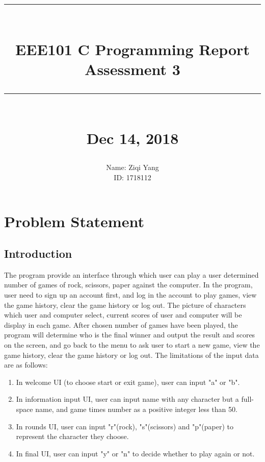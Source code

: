 \documentclass[12pt]{article}
\newcommand{\HRule}[1]{\rule{\linewidth}{#1}}
\begin{document}
	
	\title{ \normalsize \textsc{}
		\\ [2.0cm]
		\HRule{0.5pt} \\
		\LARGE \textbf{EEE101 C Programming Report\\Assessment 3}
		\HRule{2pt} \\ [0.5cm]
		\normalsize Dec 14, 2018 \vspace*{5\baselineskip}}
	
	\date{}
	
	\author{
		Name: Ziqi Yang\\
		ID: 1718112\\
	}
	
	\maketitle
	\newpage
	\tableofcontents
	\newpage
	
	
	\section{Problem Statement}
	
	\subsection{Introduction}
	The program provide an interface through which user can play a user determined number of games of rock, scissors, paper against the computer. In the program, user need to sign up an account first, and log in the account to play games, view the game history, clear the game history or log out. The picture of characters which user and computer select, current scores of user and computer will be display in each game. After chosen number of games have been played, the program will determine who is the final winner and output the result and scores on the screen, and go back to the menu to ask user to start a new game, view the game history, clear the game history or log out. The limitations of the input data are as follows:
	
	\begin{enumerate}
	\item In welcome UI (to choose start or exit game), user can input "a" or "b".
	\item In information input UI, user can input name with any character but a full-space name, and game times number as a positive integer less than 50.
	\item In rounds UI, user can input "r"(rock), "s"(scissors) and "p"(paper) to represent the character they choose.
	\item In final UI, user can input "y" or "n" to decide whether to play again or not.
	\end{enumerate}
\end{document}
